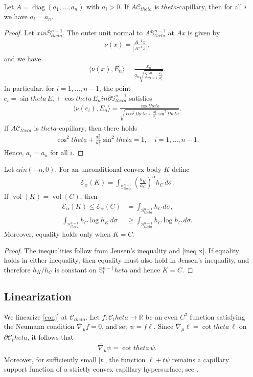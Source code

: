 \documentclass[12pt]{amsart}
\def\theta{theta}%
\def\in{in }%
\numberwithin{equation}{section}
\newcommand{\bbR}{\mathbb{R}}
\newcommand{\8}{\infty}
\newcommand{\si}{\sigma}
\newcommand{\cC}{\mathcal{C}}
\DeclareMathOperator{\vol}{vol}
\renewcommand{\(}{\left(}
\renewcommand{\)}{\right)}
\newcommand{\eq}[1]{\begin{equation}\begin{alignedat}{2} #1 \end{alignedat}\end{equation}}
\begin{document}
\begin{lemma}
	Let $A=\operatorname{diag}(a_1,\ldots,a_n)$ with $a_i>0$. If $A\cC_{\theta}$ is $\theta$-capillary, then for all $i$ we have $a_i=a_n$.
\end{lemma}
\begin{proof}
Let $x \in \mathbb{S}^{n-1}_{\theta}$. The outer unit  normal to $A \mathbb{S}^{n-1}_{\theta}$ at $Ax$ is given by
\eq{
    \nu(x) = \frac{A^{-1}x}{|A^{-1}x|},
}
and we have
\eq{
    \langle \nu(x), E_n \rangle 
    = \frac{x_n}{a_n\sqrt{\sum_{i=1}^n \tfrac{x_i^2}{a_i^2}}}.
}
In particular, for $i=1,\ldots,n-1$, the point $e_i = \sin\theta\, E_i + \cos\theta\, E_n \in \partial \mathbb{S}^{n-1}_{\theta}$ satisfies
\eq{
    \langle \nu(e_i), E_n \rangle
    = \frac{\cos\theta}{\sqrt{\cos^2\theta + \tfrac{a_n^2}{a_i^2}\sin^2\theta}}.
}
If $A \mathcal{C}_{\theta}$ is $\theta$-capillary, then there holds
\eq{
    \cos^2\theta + \frac{a_n^2}{a_i^2}\sin^2\theta = 1, \quad i=1,\ldots,n-1.
}
Hence, $a_i = a_n$ for all $i$.
\end{proof}


\begin{cor}\label{cor 1}Let $\alpha \in (-n, 0)$. For an unconditional convex body $K$ define
\eq{
\mathcal{E}_\alpha(K) = \int_{\mathbb{S}_{\theta}^{n-1}} \left( \frac{h_K}{h_C} \right)^\alpha h_C\, d\si.
}
If $\vol(K) = \vol(C)$, then
\eq{
\mathcal{E}_\alpha(K) \leq \mathcal{E}_\alpha(C) &= \int_{\mathbb{S}_{\theta}^{n-1}} h_C\, d\si, \\
\int_{\mathbb{S}_{\theta}^{n-1}} h_C \log h_K\, d\si &\geq \int_{\mathbb{S}_{\theta}^{n-1}} h_C \log h_C\, d\si.
}
Moreover, equality holds only when $K = C$.
\end{cor}
\begin{proof}
The inequalities follow from Jensen's inequality and \eqref{ineq x}. If equality holds in either inequality, then equality must also hold in Jensen's inequality, and therefore $h_K/h_C$ is constant on $\mathbb{S}^{n-1}_\theta$ and hence $K=C$.
\end{proof}

\subsection{Linearization}
We linearize \eqref{conj} at $\cC_{\theta}$. Let $f:\mathcal C_\theta\to\bbR$ be an even $C^2$ function satisfying the Neumann condition $\bar\nabla_\mu f=0$, and set $\psi=f\ell$. Since $\bar\nabla_\mu\ell=\cot\theta\,\ell$ on $\partial\mathcal C_\theta$, it follows that
\eq{
\bar\nabla_\mu\psi=\cot\theta\,\psi.
}
Moreover, for sufficiently small $|t|$, the function $\ell+t\psi$ remains a capillary support function of a strictly convex capillary hypersurface; see \cite[Prop. 2.6]{MWWX25}.
\end{document}
